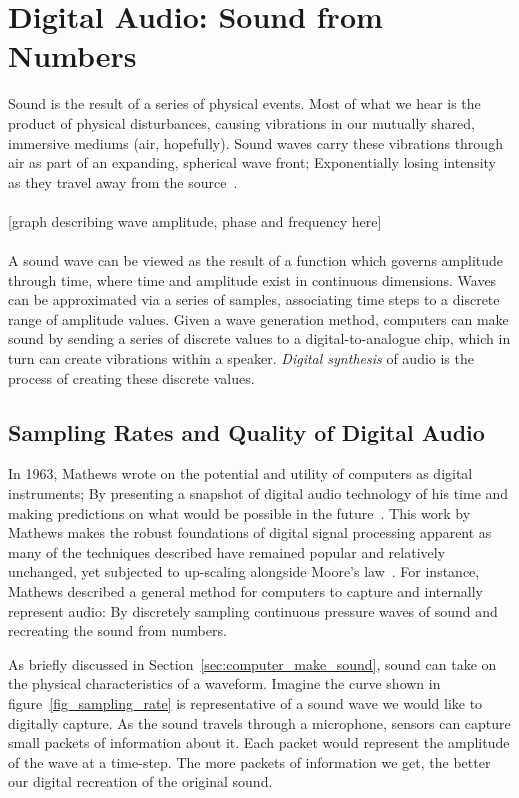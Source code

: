 \documentclass[runningheads,a4paper]{llncs}
\begin{document}
\section{Digital Audio: Sound from Numbers}
Sound is the result of a series of physical events. Most of what we hear is the product of physical disturbances, causing vibrations in our mutually shared, immersive mediums (air, hopefully). Sound waves carry these vibrations through air as part of an expanding, spherical wave front; Exponentially losing intensity as they travel away from the source~\cite{cook1999chap4}. 
\\\\

[graph describing wave amplitude, phase and frequency here]
\\\\
A sound wave can be viewed as the result of a function which governs amplitude through time, where time and amplitude exist in continuous dimensions. Waves can be approximated via a series of samples, associating time steps to a discrete range of amplitude values. 
Given a wave generation method, computers can make sound by sending a series of discrete values to a digital-to-analogue chip, which in turn can
create vibrations within a speaker.  \textit{Digital synthesis} of audio is the process of creating these discrete values. 
\\

\subsection{Sampling Rates and Quality of Digital Audio}
\label{sec_sampling_rates}
In 1963, Mathews wrote on the potential and utility of computers as digital instruments; By presenting a snapshot of digital audio technology of his time and making predictions on what would be possible in the future~\cite{mathews1963digital}. This work by Mathews makes the robust foundations of digital signal processing apparent as many of the techniques described have remained popular and relatively unchanged, yet subjected to up-scaling alongside Moore's law~\cite{mack2011fifty,smith1991viewpoints}. For instance, Mathews described a general method for computers to capture and internally represent audio: By discretely sampling continuous pressure waves of sound and recreating the sound from numbers. 

As briefly discussed in Section~\ref{sec:computer_make_sound}, sound can take on the physical characteristics of a waveform. Imagine the curve shown in figure~\ref{fig_sampling_rate} is representative of a sound wave we would like to digitally capture. As the sound travels through a microphone, sensors can capture small packets of information about it. Each packet would represent the amplitude of the wave at a time-step. The more packets of information we get, the better our digital recreation of the original sound.
\end{document}
